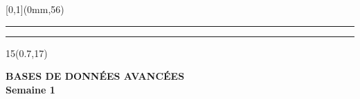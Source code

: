 \begingroup
{}
\textblockorigin{0mm}{0mm}
\setlength{\parindent}{0mm}
\setlength{\imageheight}{54.9191919\TPVertModule}
\setlength{\logoheight}{4\TPVertModule}
\setlength{\bandeorwidth}{3.3\logoheight}
\setlength{\banderougewidth}{\paperwidth}
\addtolength{\banderougewidth}{-\bandeorwidth}
\setlength{\bandeorheight}{\TPVertModule}
\setlength{\banderougeheight}{\TPVertModule}
\setlength{\textwidth}{\paperwidth}
\addtolength{\textwidth}{-2\TPHorizModule}

\def\titlefmt{%
	\bfseries\fontsize{24}{24}\selectfont%
	BASES DE DONNÉES AVANCÉES\\Semaine 1\par}


\def\david{%
	\OverpassLight\fontsize{5}{5}\selectfont%
	\bfseries\textcolor{black}{David Beauchemin\\david.beauchemin.5@ulaval.ca}}

\begin{frame}[plain]
	\begin{textblock*}{\paperwidth}[0,1](0mm,56\TPVertModule)
		\textcolor{rouge}{\rule{\banderougewidth}{\banderougeheight}}%
		\textcolor{bleu}{\rule{\bandeorwidth}{\bandeorheight}}
	\end{textblock*}
	
	\begin{textblock*}{15\TPHorizModule}(0.7\TPHorizModule,17\TPVertModule)
		\textcolor[rgb]{0.13,0.13,0.13}{\titlefmt}
	\end{textblock*}
\end{frame}
\endgroup
